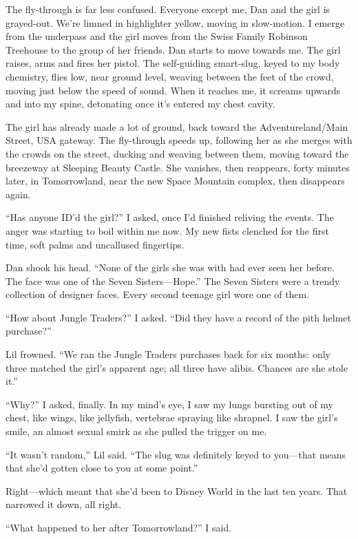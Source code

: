 The fly-through is far less confused. Everyone except me, Dan and
the girl is grayed-out. We're limned in highlighter yellow, moving
in slow-motion. I emerge from the underpass and the girl moves from
the Swiss Family Robinson Treehouse to the group of her friends.
Dan starts to move towards me. The girl raises, arms and fires her
pistol. The self-guiding smart-slug, keyed to my body chemistry,
flies low, near ground level, weaving between the feet of the
crowd, moving just below the speed of sound. When it reaches me, it
screams upwards and into my spine, detonating once it's entered my
chest cavity.

The girl has already made a lot of ground, back toward the
Adventureland/Main Street, USA gateway. The fly-through speeds up,
following her as she merges with the crowds on the street, ducking
and weaving between them, moving toward the breezeway at Sleeping
Beauty Castle. She vanishes, then reappears, forty minutes later,
in Tomorrowland, near the new Space Mountain complex, then
disappears again.

“Has anyone ID'd the girl?” I asked, once I'd finished reliving the
events. The anger was starting to boil within me now. My new fists
clenched for the first time, soft palms and uncallused fingertips.

Dan shook his head. “None of the girls she was with had ever seen
her before. The face was one of the Seven Sisters—Hope.” The Seven
Sisters were a trendy collection of designer faces. Every second
teenage girl wore one of them.

“How about Jungle Traders?” I asked. “Did they have a record of the
pith helmet purchase?”

Lil frowned. “We ran the Jungle Traders purchases back for six
months: only three matched the girl's apparent age; all three have
alibis. Chances are she stole it.”

“Why?” I asked, finally. In my mind's eye, I saw my lungs bursting
out of my chest, like wings, like jellyfish, vertebrae spraying
like shrapnel. I saw the girl's smile, an almost sexual smirk as
she pulled the trigger on me.

“It wasn't random,” Lil said. “The slug was definitely keyed to
you—that means that she'd gotten close to you at some point.”

Right—which meant that she'd been to Disney World in the last ten
years. That narrowed it down, all right.

“What happened to her after Tomorrowland?” I said.

